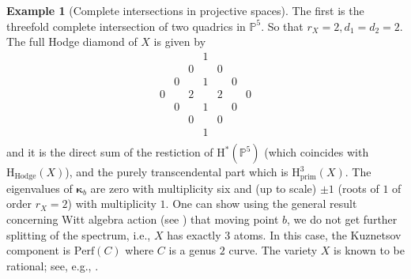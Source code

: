 \documentclass[12pt,a4paper]{amsart}
\theoremstyle{definition}
\newtheorem{example}[theorem]{Example}
\theoremstyle{remark}
\newcommand{\rH}{\mathrm{H}}
\begin{document}
\begin{example}[Complete intersections in projective spaces]
The first is the threefold complete intersection of two quadrics in $\mathbb P^5$. So that $r_X=2, d_1=d_2=2$. The full Hodge diamond of $X$ is given by
\[
\begin{array}{ccccccc}
 &  &  & 1 &  &  & \\
 &  & 0 &  & 0 &  & \\
 & 0 &  & 1 &  & 0 & \\
0 &  & 2 &  & 2 &  & 0\\
 & 0 &  & 1 &  & 0 & \\
 &  & 0 &  & 0 &  & \\
 &  &  & 1 &  &  & \\
\end{array}
\]
and it is the direct sum of the restiction of $\rH^{\ast}(\mathbb P^5)$ (which coincides with  $\rH_{\mathrm{Hodge}}(X)$), and the purely transcendental part which is $\rH^3_{\mathrm{prim}}(X)$. The eigenvalues of $\boldsymbol{\kappa}_b$ are zero with multiplicity six and (up to scale) $\pm 1$ (roots of $1$ of order $r_X=2$) with multiplicity $1$. One can show using the general result concerning Witt algebra action (see \cite[Remark 3.14, p. 22]{katzarkovpantevyu}) that moving point $b$, we do not get further splitting of the spectrum, i.e., $X$ has exactly $3$ atoms. In this case, the Kuznetsov component is $\mathrm{Perf}(C)$ where $C$ is a genus $2$ curve. The variety $X$ is known to be rational; see, e.g., \cite{reid1972}.


\end{example}
\end{document}
